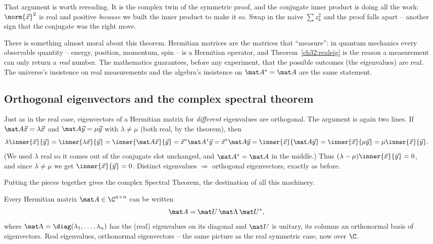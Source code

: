 That argument is worth rereading. It is the complex twin of the symmetric proof,
and the conjugate inner product is doing all the work: $\norm{\vec x}^2$ is real
and positive \emph{because} we built the inner product to make it so. Swap in the
naive $\sum z_k^2$ and the proof falls apart -- another sign that the conjugate was
the right move.

\begin{aestheticbox}
There is something almost moral about this theorem. Hermitian matrices are the
matrices that ``measure'': in quantum mechanics every observable quantity --
energy, position, momentum, spin -- is a Hermitian operator, and
Theorem~\ref{ch32:realeig} is the reason a measurement can only return a
\emph{real} number. The mathematics guarantees, before any experiment, that the
possible outcomes (the eigenvalues) are real. The universe's insistence on real
measurements and the algebra's insistence on $\mat A^{*}=\mat A$ are the same
statement.
\end{aestheticbox}

\subsection{Orthogonal eigenvectors and the complex spectral theorem}

Just as in the real case, eigenvectors of a Hermitian matrix for \emph{different}
eigenvalues are orthogonal. The argument is again two lines. If $\mat A\vec x =
\lambda\vec x$ and $\mat A\vec y = \mu\vec y$ with $\lambda\ne\mu$ (both real, by
the theorem), then
\[
  \lambda\inner{\vec x}{\vec y} = \inner{\lambda\vec x}{\vec y}
  = \inner{\mat A\vec x}{\vec y} = \vec x^{*}\mat A^{*}\vec y
  = \vec x^{*}\mat A\vec y = \inner{\vec x}{\mat A\vec y}
  = \inner{\vec x}{\mu\vec y} = \mu\inner{\vec x}{\vec y}.
\]
(We used $\lambda$ real so it comes out of the conjugate slot unchanged, and
$\mat A^{*}=\mat A$ in the middle.) Thus $(\lambda-\mu)\inner{\vec x}{\vec y}=0$,
and since $\lambda\ne\mu$ we get $\inner{\vec x}{\vec y}=0$. Distinct eigenvalues
$\Rightarrow$ orthogonal eigenvectors, exactly as before.

Putting the pieces together gives the complex Spectral Theorem, the destination of
all this machinery.

\begin{theorem}\label{ch32:spectral}
Every Hermitian matrix $\mat A\in\C^{n\times n}$ can be written
\[
  \mat A = \mat U\,\mat\Lambda\,\mat U^{*},
\]
where $\mat\Lambda = \diag(\lambda_1,\dots,\lambda_n)$ has the (real) eigenvalues
on its diagonal and $\mat U$ is unitary, its columns an orthonormal basis of
eigenvectors. Real eigenvalues, orthonormal eigenvectors -- the same picture as
the real symmetric case, now over $\C$.
\end{theorem}

